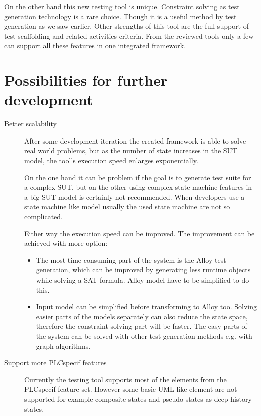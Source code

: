 On the other hand this new testing tool is unique. Constraint solving as test generation technology is a rare choice. Though it is a useful method by test generation as we saw earlier. Other strengths of this tool are the full support of test scaffolding and related activities criteria. From the reviewed tools only a few can support all these features in one integrated framework. 


\section{Possibilities for further development}
\label{sec:furtherdevelopment}

\begin{description}
	\item[Better scalability] After some development iteration the created framework is able to solve real world problems, but as the number of state increases in the SUT model, the tool's execution speed enlarges exponentially.
	
	On the one hand it can be problem if the goal is to generate test suite for a complex SUT, but on the other using complex state machine features in a big SUT model is certainly not recommended. When developers use a state machine like model usually the used state machine are not so complicated.
	
	Either way the execution speed can be improved. The improvement can be achieved with more option:
	
	\begin{itemize}
		\item The most time consuming part of the system is the Alloy test generation, which can be improved by generating less runtime objects while solving a SAT formula. Alloy model have to be simplified to do this.
		\item Input model can be simplified before transforming to Alloy too. Solving easier parts of the models separately can also reduce the state space, therefore the constraint solving part will be faster. The easy parts of the system can be solved with other test generation methods e.g. with graph algorithms.
	\end{itemize}
	\item[Support more PLCspecif features] Currently the testing tool supports most of the elements from the PLCspecif feature set. However some basic UML like element are not supported for example composite states and pseudo states as deep history states.
	

\end{description}
